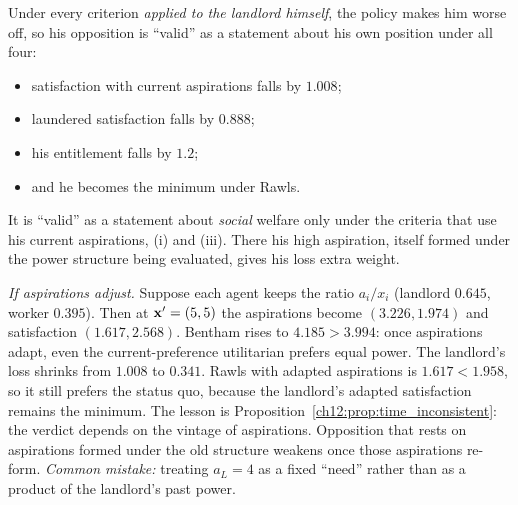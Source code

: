 \documentclass[../solutions_manual.tex]{subfiles}
\begin{document}
 Under every criterion \emph{applied to the landlord himself}, the policy makes him worse off, so his opposition is ``valid'' as a statement about his own position under all four:
\begin{itemize}
\item satisfaction with current aspirations falls by $1.008$;
\item laundered satisfaction falls by $0.888$;
\item his entitlement falls by $1.2$;
\item and he becomes the minimum under Rawls.
\end{itemize}
It is ``valid'' as a statement about \emph{social} welfare only under the criteria that use his current aspirations, (i) and (iii). There his high aspiration, itself formed under the power structure being evaluated, gives his loss extra weight.

\emph{If aspirations adjust.} Suppose each agent keeps the ratio $a_i/x_i$ (landlord $0.645$, worker $0.395$). Then at $\mathbf{x}' = (5,5)$ the aspirations become $(3.226, 1.974)$ and satisfaction $(1.617, 2.568)$. Bentham rises to $4.185 > 3.994$: once aspirations adapt, even the current-preference utilitarian prefers equal power. The landlord's loss shrinks from $1.008$ to $0.341$. Rawls with adapted aspirations is $1.617 < 1.958$, so it still prefers the status quo, because the landlord's adapted satisfaction remains the minimum. The lesson is Proposition~\ref{ch12:prop:time_inconsistent}: the verdict depends on the vintage of aspirations. Opposition that rests on aspirations formed under the old structure weakens once those aspirations re-form. \textit{Common mistake:} treating $a_L = 4$ as a fixed ``need'' rather than as a product of the landlord's past power.

\fussy
\end{document}
